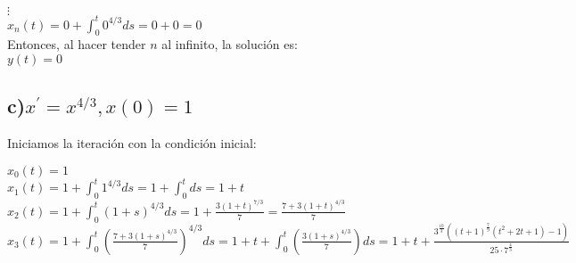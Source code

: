 $\vdots$\\

$x_{n}(t)=0+\int_{0}^{t} 0^{4 / 3} d s=0+0=0$\\

Entonces, al hacer tender $n$ al infinito, la solución es:\\

$y(t)=0$

\subsection*{c)$x^{\prime}=x^{4 / 3}, x(0)=1$}
Iniciamos la iteración con la condición inicial:

$x_{0}(t)=1$\\

$x_{1}(t)=1+\int_{0}^{t} 1^{4 / 3} d s=1+\int_{0}^{t} ds= 1+t$\\

$x_{2}(t)=1+\int_{0}^{t}(1+s)^{4 / 3} d s=1+\frac{3(1+t)^{7 / 3}}{7}=\frac{7+3(1+t)^{4 / 3}}{7}$\\

$x_{3}(t)=1+\int_{0}^{t}\left(\frac{7+3(1+s)^{4 / 3}}{7}\right)^{4 / 3} ds= 1+t+\int_{0}^{t}\left(\frac{3(1+s)^{4 / 3}}{7}\right) ds=1+t+ \frac{3^{\frac{10}{3}}\left((t+1)^{\frac{7}{9}}\left(t^{2}+2 t+1\right)-1\right)}{25 \cdot 7^{\frac{4}{3}}}$